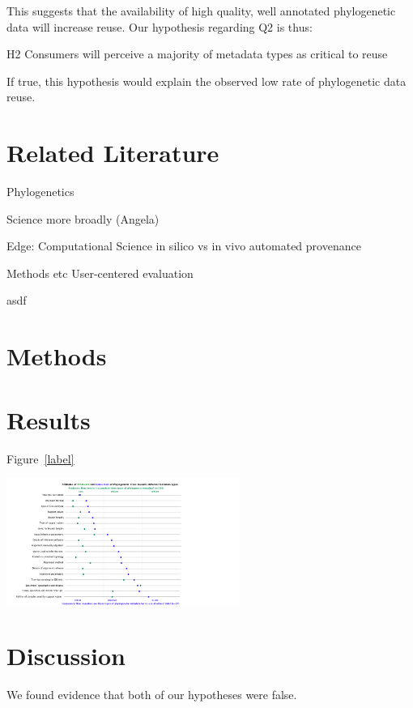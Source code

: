 \documentclass[12pt]{scrartcl}
\newenvironment{Figure}
  {\par\medskip\noindent\minipage{\linewidth}}
  {\endminipage\par\medskip}
\begin{document}
\begin{multicols}{2}
This suggests that the availability of high quality, well annotated phylogenetic data will increase reuse.  Our hypothesis regarding Q2 is thus:
\begin{compactitem}
	\item[H2] Consumers will perceive a majority of metadata types as critical to reuse
\end{compactitem}
If true, this hypothesis would explain the observed low rate of phylogenetic data reuse.

\section{Related Literature}

Phylogenetics

Science more broadly (Angela)

Edge: Computational Science
in silico vs in vivo
automated provenance

Methods etc
User-centered evaluation

\begin{compactitem}
  \item asdf
\end{compactitem}

\section{Methods}

\section{Results}
Figure~\ref{label}
\begin{Figure}
	\includegraphics[width=3in]{rasters/OTOL graph - wide.png}
	\label{label}
\end{Figure}

\section{Discussion}
We found evidence that both of our hypotheses were false. 


\end{multicols}
\end{document}
